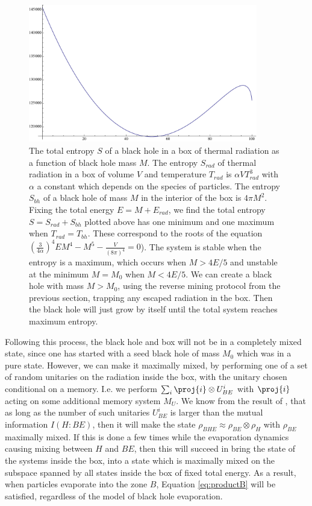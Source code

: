 \documentclass[11pt,a4paper]{article}
\begin{document}
\begin{figure}
\includegraphics[width=10cm]{initialmass.pdf}
	\caption{The total entropy $S$ of a black hole in a box of thermal radiation as a function of black hole mass $M$. The entropy $S_{rad}$ of thermal radiation in a box of volume $V$ and temperature $T_{rad}$ is $\alpha V T_{rad}^3$ with $\alpha$ a constant which depends on the species of particles. The entropy $S_{bh}$ of a black hole of mass $M$ in the interior of the box is $4\pi M^2$. Fixing the total energy $E=M+E_{rad}$, we find the total entropy 
	$S=S_{rad}+S_{bh}$ plotted above has one minimum and one maximum when $T_{rad}=T_{bh}$. These correspond to the roots of the equation 
	$(\frac{3}{4\alpha})^4EM^4-M^5-\frac{V}{(8\pi)^4}=0$). The system is stable when the entropy is a maximum, which occurs when $M>4E/5$ \cite{hawking1976black} and unstable at the minimum $M=M_0$ when $M<4E/5$.  We can create a black hole with mass $M>M_0$, using the reverse mining protocol from the previous section, trapping any escaped radiation in the box. Then the black hole will just grow by itself until the total system reaches maximum entropy.
	}
\label{fig:bhbox}
\end{figure}

Following this process, the black hole and box will not be in a completely mixed state, since one has started with a seed black hole of mass $M_0$ which was in a pure state. However, we can make it maximally mixed, by performing one of a set of random unitaries on the radiation inside the box, with the unitary chosen conditional on a memory. I.e. we perform 
$\sum_i\proj{i}\otimes U^i_{BE}$ with $\proj{i}$ acting on some additional memory system $M_U$.  We know from the result of \cite{GroismanPW04}, that as long as the number of such unitaries $U^i_{BE}$ is larger than the mutual information $I(H:BE)$, then it will make the state $\rho_{BHE}\approx\rho_{BE}\otimes
\rho_H$ with $\rho_{BE}$ maximally mixed. If this is done a few times while the evaporation dynamics causing mixing between $H$ and $BE$, then this will  succeed in bring the state of the systems inside the box, into a state which is maximally mixed on the subspace spanned by all states inside the box of fixed total energy. As a result, when particles evaporate into the zone $B$,  Equation \eqref{eq:productB} will be satisfied, regardless of the model of black hole evaporation.
\end{document}
